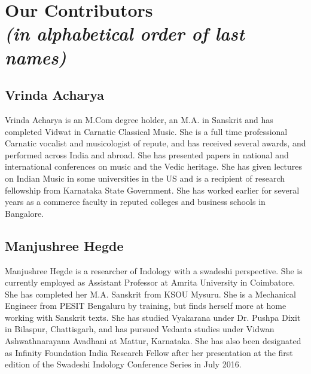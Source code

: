 \makeatletter
\def\@makeschapterhead#1{%
  \vspace*{50\p@}%
  {\parindent \z@ \raggedright
    \normalfont
    \interlinepenalty\@M
    \LARGE \bfseries  #1\par\nobreak
    \vskip 20\p@
  }}
\makeatother

\chapter*{Our Contributors\\ {\rm\sl\small (in alphabetical order of last names)}}\label{contributors}

\lhead[\small\thepage]{}
\rhead[]{\small\thepage}
\chead[]{}
\cfoot[]{}

\section*{Vrinda Acharya}

Vrinda Acharya is an M.Com degree holder, an M.A. in Sanskrit and has completed Vidwat in Carnatic Classical Music. She is a full time professional Carnatic vocalist and musicologist of repute, and has received several awards, and performed across India and abroad. She has presented papers in national and international conferences on music and the Vedic heritage. She has given lectures on Indian Music in some universities in the US and is a recipient of research fellowship from Karnataka State Government. She has worked earlier for several years as a commerce faculty in reputed colleges and business schools in Bangalore.

\section*{Manjushree Hegde}

Manjushree Hegde is a researcher of Indology with a swadeshi perspective. She is currently employed as Assistant Professor at Amrita University in Coimbatore. She has completed her M.A. Sanskrit from KSOU Mysuru. She is a Mechanical Engineer from PESIT Bengaluru by training, but finds herself more at home working with Sanskrit texts. She has studied Vyakarana under Dr. Pushpa Dixit in Bilaspur, Chattisgarh, and has pursued Vedanta studies under Vidwan Ashwathnarayana Avadhani at Mattur, Karnataka. She has also been designated as Infinity Foundation India Research Fellow after her presentation at the first edition of the Swadeshi Indology Conference Series in July 2016.

